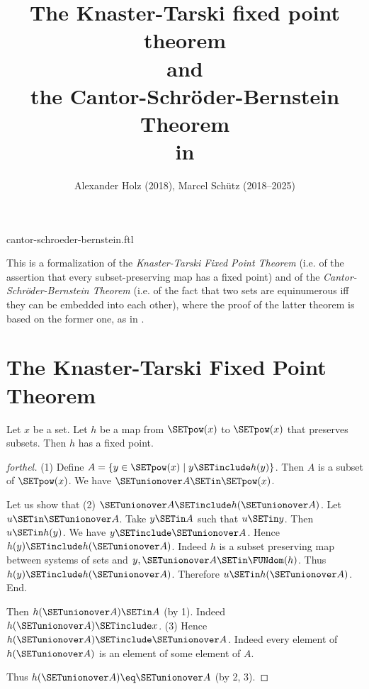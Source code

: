 \documentclass{article}
\title{The Knaster-Tarski fixed point theorem\\and\\the Cantor-Schröder-Bernstein Theorem\\in \Naproche}
\author{Alexander Holz (2018), Marcel Schütz (2018--2025)}
\date{}
\begin{document}
\begin{smodule}{cantor-schroeder-bernstein.ftl}
\maketitle


\noindent This is a formalization of the \textit{Knaster-Tarski Fixed Point
Theorem} (i.e. of the assertion that every subset-preserving map has a fixed
point) and of the \textit{Cantor-Schröder-Bernstein Theorem} (i.e. of the
fact that two sets are equinumerous iff they can be embedded into each other),
where the proof of the latter theorem is based on the former one, as in
\cite{Schroeder2012}.

\section*{The Knaster-Tarski Fixed Point Theorem}

\begin{theorem}[forthel,title=Knaster-Tarski,id=knaster_tarski]
  Let $x$ be a set.
  Let $h$ be a map from $\SETpow(x)$ to $\SETpow(x)$ that preserves subsets.
  Then $h$ has a fixed point.
\end{theorem}
\begin{proof}[forthel]
  (1) Define $A = \{y \in \SETpow(x) \mid y \SETinclude h(y)\}$.
  Then $A$ is a subset of $\SETpow(x)$.
  We have $\SETunionover A \SETin \SETpow(x)$.

  Let us show that (2) $\SETunionover A \SETinclude h(\SETunionover A)$.
    Let $u \SETin \SETunionover A$.
    Take $y \SETin A$ such that $u \SETin y$.
    Then $u \SETin h(y)$.
    We have $y \SETinclude \SETunionover A$.
    Hence $h(y) \SETinclude h(\SETunionover A)$.
    Indeed $h$ is a subset preserving map between systems of sets and $y, \SETunionover A \SETin \FUNdom(h)$.
    Thus $h(y) \SETinclude h(\SETunionover A)$.
    Therefore $u \SETin h(\SETunionover A)$.
  End.

  Then $h(\SETunionover A) \SETin A$ (by 1).
  Indeed $h(\SETunionover A) \SETinclude x$.
  (3) Hence $h(\SETunionover A) \SETinclude \SETunionover A$.
  Indeed every element of $h(\SETunionover A)$ is an element of some element of
  $A$.

  Thus $h(\SETunionover A) \eq \SETunionover A$ (by 2, 3).
\end{proof}



\end{smodule}
\end{document}
